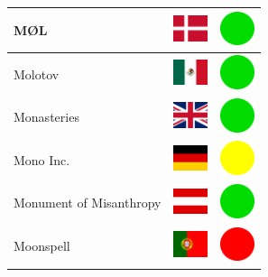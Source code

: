 \documentclass[12pt, a4paper, twoside]{report}
\begin{document}
\begin{center}
\begin{longtable}{|p{5cm}|p{2cm}|p{2cm}|}
 MØL                                                        & \includegraphics[width=1cm]{4x3/dk} &   \includegraphics[width=1cm]{likes/y} \\ \hline
 Molotov                                                    & \includegraphics[width=1cm]{4x3/mx} &   \includegraphics[width=1cm]{likes/y} \\ \hline
 Monasteries                                                & \includegraphics[width=1cm]{4x3/gb} &   \includegraphics[width=1cm]{likes/y} \\ \hline
 Mono Inc.                                                  & \includegraphics[width=1cm]{4x3/de} &   \includegraphics[width=1cm]{likes/m} \\ \hline
 Monument of Misanthropy                                    & \includegraphics[width=1cm]{4x3/at} &   \includegraphics[width=1cm]{likes/y} \\ \hline
 Moonspell                                                  & \includegraphics[width=1cm]{4x3/pt} &   \includegraphics[width=1cm]{likes/n} \\ \hline

\end{longtable}
\end{center}
\end{document}
